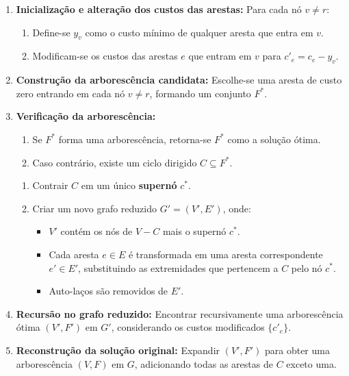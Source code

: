 \documentclass[12pt,a4paper]{article}
\begin{document}
\begin{enumerate}
    \item \textbf{Inicialização e alteração dos custos das arestas:}  
    Para cada nó \( v \neq r \):
    \begin{enumerate}
        \item Define-se \( y_v \) como o custo mínimo de qualquer aresta que entra em \( v \).
        \item Modificam-se os custos das arestas \( e \) que entram em \( v \) para \( c'_e = c_e - y_v \).
    \end{enumerate}

    \item \textbf{Construção da arborescência candidata:}  
    Escolhe-se uma aresta de custo zero entrando em cada nó \( v \neq r \), formando um conjunto \( F^* \).

    \item \textbf{Verificação da arborescência:}  
    \begin{enumerate}
        \item Se \( F^* \) forma uma arborescência, retorna-se \( F^* \) como a solução ótima.
        \item Caso contrário, existe um ciclo dirigido \( C \subseteq F^* \).
    \end{enumerate}

    \begin{enumerate} 
                \item Contrair \( C \) em um único \textbf{supernó} \( c^* \).
                \item Criar um novo grafo reduzido \( G' = (V', E') \), onde:
                \begin{itemize}
                    \item \( V' \) contém os nós de \( V - C \) mais o supernó \( c^* \).
                    \item Cada aresta \( e \in E \) é transformada em uma aresta correspondente \( e' \in E' \), substituindo as extremidades que pertencem a \( C \) pelo nó \( c^* \).
                    \item Auto-laços são removidos de \( E' \).
                \end{itemize}
            \end{enumerate}

    \item \textbf{Recursão no grafo reduzido:}  
    Encontrar recursivamente uma arborescência ótima \( (V', F') \) em \( G' \), considerando os custos modificados \( \{c'_e\} \).

    \item \textbf{Reconstrução da solução original:}  
    Expandir \( (V', F') \) para obter uma arborescência \( (V, F) \) em \( G \), adicionando todas as arestas de \( C \) exceto uma.
    \end{enumerate}
\end{document}
